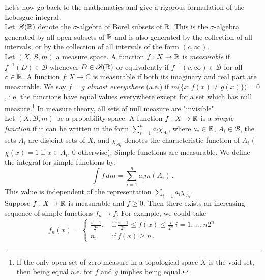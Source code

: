 Let's now go back to the mathematics and give a rigorous formulation of the Lebesgue integral.\\
Let $\mathscr{B}(\mathbb{R})$ denote the $\sigma$-algebra of Borel subsets of $\mathbb{R}$. This is the $\sigma$-algebra generated by all open subsets of $\mathbb{R}$ and is also generated by the collection of all intervals, or by the collection of all intervals of the form $(c, \infty)$. 
\\Let $(X, \mathscr{B}, m)$ a measure space. A function $f: X \rightarrow \mathbb{R}$ is \textit{measurable} if $f^{-1}(D) \in \mathscr{B}$ whenever $D \in \mathscr{B}(\mathbb{R})$ or equivalently if $f^{-1}(c, \infty) \in \mathscr{B}$ for all $c \in \mathbb{R}$. A function $f: X \rightarrow \mathbb{C}$ is measurable if both its imaginary and real part are measurable. We say $f=g$ \textit{almost everywhere} (a.e.) if $m\big( 
\{ x: f(x) \neq g(x) \} \big) = 0$, i.e. the functions have equal values everywhere except for a set which has null measure.\footnote{If the only open set of zero measure in a topological space $X$ is the void set, then being equal a.e. for $f$ and $g$ implies being equal. } In measure theory, all sets of null measure are "invisible". 
\\Let $(X, \mathscr{B}, m)$ be a probability space. A function $f: X \rightarrow \mathbb{R}$ is a \textit{simple function} if it can be written in the form $\sum_{i=1}^n a_i \chi_{A_i}$, where $a_i \in \mathbb{R}$, $A_i \in \mathscr{B}$, the sets $A_i$ are disjoint sets of $X$, and $\chi_{A_i}$ denotes the characteristic function of $A_i$ ($\chi(x) = 1$ if $x \in A_i$, $0$ otherwise). Simple functions are measurable. We define the integral for simple functions by:
\begin{equation}
    \label{eq:simple_functions_integral}
    \int f \, dm = \sum_{i=1}^n a_i m(A_i) \, .
\end{equation}
This value is independent of the representation $\sum_{i=1} a_i \chi_{A_i}$.  
\\Suppose $f: X \rightarrow \mathbb{R}$ is measurable and $f \geq 0$. Then there exists an increasing sequence of simple functions $f_n \rightarrow f$. For example, we could take
\begin{equation*}
    f_n(x) = 
    \begin{cases}
        \frac{i-1}{2^n}, \:& \text{if} \, \frac{i-1}{2^n} \leq f(x) \leq \frac{i}{2^n} \: i = 1, \dots, n2^n \\
        n, & \text{if} \, f(x) \geq n \, .
    \end{cases}
\end{equation*}
